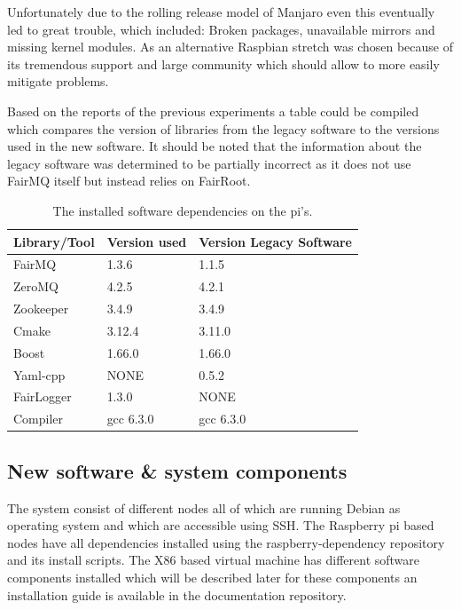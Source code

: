 \documentclass[]{article}
\begin{document}
Unfortunately due to the rolling release model of Manjaro even this eventually led to great trouble, which included: Broken packages, unavailable mirrors and missing kernel modules. As an alternative Raspbian stretch was chosen because of its tremendous support and large community which should allow to more easily mitigate problems.

Based on the reports of the previous experiments a table could be compiled which compares the version of libraries from the legacy software to the versions used in the new software. It should be noted that the information about the legacy software was determined to be partially incorrect as it does not use FairMQ itself but instead relies on FairRoot.

\begin{table}[H]
	\begin{center}
		\begin{tabular}{ | l | l | l | }
			\hline			
			\textbf{Library/Tool} & \textbf{Version used} & \textbf{Version Legacy Software} \\ \hline
			
			FairMQ & 1.3.6 & 1.1.5 \\ \hline
			ZeroMQ & 4.2.5 & 4.2.1 \\ \hline
			Zookeeper & 3.4.9 & 3.4.9 \\ \hline
			Cmake & 3.12.4 & 3.11.0 \\ \hline
			Boost & 1.66.0 & 1.66.0 \\ \hline
			Yaml-cpp & NONE & 0.5.2 \\ \hline
			FairLogger & 1.3.0 & NONE \\ \hline
			Compiler & gcc 6.3.0 & gcc 6.3.0 \\	\hline
		\end{tabular}
		\caption{The installed software dependencies on the pi’s.}
		\label{tab:librabies}
	\end{center}
\end{table}


\subsection{New software \& system components}
The system consist of different nodes all of which are running Debian as operating system and which are accessible using SSH. The Raspberry pi based nodes have all dependencies installed using the raspberry-dependency repository and its install scripts. The X86 based virtual machine has different software components installed which will be described later for these components an installation guide is available in the documentation repository.
\end{document}
